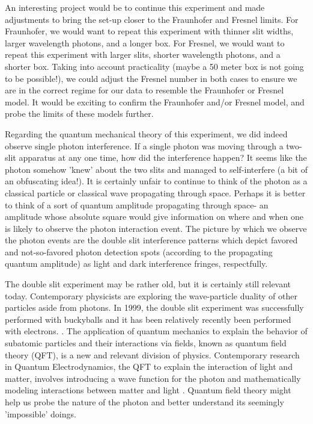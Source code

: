 \documentclass[prb,preprint]{revtex4-1}
\begin{document}
{An interesting project would be to continue this experiment and made adjustments to bring the set-up closer to the Fraunhofer and Fresnel limits.  For Fraunhofer, we would want to repeat this experiment with thinner slit widths, larger wavelength photons, and a longer box.  For Fresnel, we would want to repeat this experiment with larger slits, shorter wavelength photons, and a shorter box.  Taking into account practicality (maybe a 50 meter box is not going to be possible!), we could adjust the Fresnel number in both cases to ensure we are in the correct regime for our data to resemble the Fraunhofer or Fresnel model.  It would be exciting to confirm the Fraunhofer and/or Fresnel model, and probe the limits of these models further.

Regarding the quantum mechanical theory of this experiment, we did indeed observe single photon interference.  If a single photon was moving through a two-slit apparatus at any one time, how did the interference happen?  It seems like the photon somehow 'knew' about the two slits and managed to self-interfere (a bit of an obfuscating idea!).  It is certainly unfair to continue to think of the photon as a classical particle or classical wave propagating through space.  Perhaps it is better to think of a sort of quantum amplitude propagating through space- an amplitude whose absolute square would give information on where and when one is likely to observe the photon interaction event.  The picture by which we observe the photon events are the double slit interference patterns which depict favored and not-so-favored photon detection spots (according to the propagating quantum amplitude) as light and dark interference fringes, respectfully.  \cite{teachspin}

The double slit experiment may be rather old, but it is certainly still relevant today.  Contemporary physicists are exploring the wave-particle duality of other particles aside from photons.  In 1999, the double slit experiment was successfully performed with buckyballs and it has been relatively recently been performed with electrons.   \cite{bucky}.  The application of quantum mechanics to explain the behavior of subatomic particles and their interactions via fields, known as quantum field theory (QFT), is a new and relevant division of physics.  Contemporary research in Quantum Electrodynamics, the QFT to explain the interaction of light and matter, involves introducing a wave function for the photon and mathematically modeling interactions between matter and light \cite{iwo}.  Quantum field theory might help us probe the nature of the photon and better understand its seemingly 'impossible' doings.

}
\end{document}
